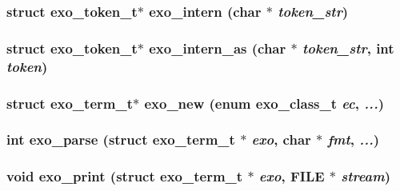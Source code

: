 \subsubsection[{exo\_\-intern}]{\setlength{\rightskip}{0pt plus 5cm}struct {\bf exo\_\-token\_\-t}$\ast$ exo\_\-intern (char $\ast$ {\em token\_\-str})\hspace{0.3cm}{\tt  [read]}}\label{libexo_8h_e14ab7b6d2d654144eba785785bcd88d}


\subsubsection[{exo\_\-intern\_\-as}]{\setlength{\rightskip}{0pt plus 5cm}struct {\bf exo\_\-token\_\-t}$\ast$ exo\_\-intern\_\-as (char $\ast$ {\em token\_\-str}, \/  int {\em token})\hspace{0.3cm}{\tt  [read]}}\label{libexo_8h_414a0d04576b8e8b4277b886c9853509}


\subsubsection[{exo\_\-new}]{\setlength{\rightskip}{0pt plus 5cm}struct {\bf exo\_\-term\_\-t}$\ast$ exo\_\-new (enum {\bf exo\_\-class\_\-t} {\em ec}, \/   {\em ...})\hspace{0.3cm}{\tt  [read]}}\label{libexo_8h_b07270e3a071f1125f8ce98ef4440977}


\subsubsection[{exo\_\-parse}]{\setlength{\rightskip}{0pt plus 5cm}int exo\_\-parse (struct {\bf exo\_\-term\_\-t} $\ast$ {\em exo}, \/  char $\ast$ {\em fmt}, \/   {\em ...})}\label{libexo_8h_59704bd189fd3ca0ba4ba111a5247c2b}


\subsubsection[{exo\_\-print}]{\setlength{\rightskip}{0pt plus 5cm}void exo\_\-print (struct {\bf exo\_\-term\_\-t} $\ast$ {\em exo}, \/  FILE $\ast$ {\em stream})}\label{libexo_8h_f1fb6fb9d13d559b70458611592d58d5}



